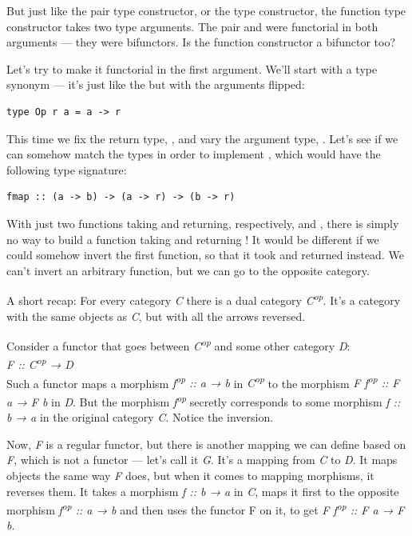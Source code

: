 But just like the pair type constructor, or the  type
constructor, the function type constructor takes two type arguments. The
pair and  were functorial in both arguments --- they were
bifunctors. Is the function constructor a bifunctor too?

Let's try to make it functorial in the first argument. We'll start with
a type synonym --- it's just like the  but with the
arguments flipped:

\begin{verbatim}
type Op r a = a -> r
\end{verbatim}

This time we fix the return type, , and vary the argument
type, . Let's see if we can somehow match the types in order
to implement , which would have the following type
signature:

\begin{verbatim}
fmap :: (a -> b) -> (a -> r) -> (b -> r)
\end{verbatim}

With just two functions taking  and returning, respectively,
 and , there is simply no way to build a function
taking  and returning ! It would be different if we
could somehow invert the first function, so that it took  and
returned  instead. We can't invert an arbitrary function, but
we can go to the opposite category.

A short recap: For every category \emph{C} there is a dual category
\emph{C\textsuperscript{op}}. It's a category with the same objects as
\emph{C}, but with all the arrows reversed.

Consider a functor that goes between \emph{C\textsuperscript{op}} and
some other category \emph{D}:\\
\emph{F :: C\textsuperscript{op} → D}\\
Such a functor maps a morphism \emph{f\textsuperscript{op} :: a → b} in
\emph{C\textsuperscript{op}} to the morphism \emph{F
f\textsuperscript{op} :: F a → F b} in \emph{D}. But the morphism
\emph{f\textsuperscript{op}} secretly corresponds to some morphism
\emph{f :: b → a} in the original category \emph{C}. Notice the
inversion.

Now, \emph{F} is a regular functor, but there is another mapping we can
define based on \emph{F}, which is not a functor --- let's call it
\emph{G}. It's a mapping from \emph{C} to \emph{D}. It maps objects the
same way \emph{F} does, but when it comes to mapping morphisms, it
reverses them. It takes a morphism \emph{f :: b → a} in \emph{C}, maps
it first to the opposite morphism \emph{f\textsuperscript{op} :: a → b}
and then uses the functor F on it, to get \emph{F f\textsuperscript{op}
:: F a → F b}.

